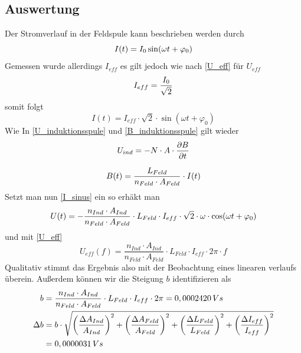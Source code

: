 \documentclass{article}
\begin{document}
\subsection{Auswertung}
Der Stromverlauf in der Feldspule kann beschrieben werden durch
\begin{equation}
I(t) = I_0 \sin(\omega t + \varphi_0)
\notag
\end{equation}
Gemessen wurde allerdings \( I_{eff} \) es gilt jedoch wie nach \eqref{U_eff} für \( U_{eff} \)
\begin{equation}
I_{eff} = \frac{I_0}{\sqrt{2}}
\notag
\end{equation}
somit folgt
\begin{equation}
I(t) = I_{eff} \cdot \sqrt{2} \cdot \sin(\omega t + \varphi_0)
\label{I_sinus}
\end{equation}
Wie In \eqref{U_induktionsspule} und \eqref{B_induktionsspule} gilt wieder
\begin{equation}
U_{ind} = -N \cdot A \cdot \frac{\partial B}{\partial t}
\notag
\end{equation}

\begin{equation}
B(t) = \frac{L_{Feld}}{n_{Feld} \cdot A_{Feld}} \cdot I(t)
\notag
\end{equation}
Setzt man nun \eqref{I_sinus} ein so erhäkt man
\begin{equation}
U(t) = -\frac{n_{Ind} \cdot A_{Ind}}{n_{Feld} \cdot A_{Feld}} \cdot L_{Feld} \cdot I_{eff} \cdot \sqrt{2} \cdot \omega \cdot \cos(\omega t + \varphi_0)
\notag
\end{equation}
und mit \eqref{U_eff}
\begin{equation}
U_{eff}(f) = \frac{n_{Ind} \cdot A_{Ind}}{n_{Feld} \cdot A_{Feld}} \cdot L_{Feld} \cdot I_{eff} \cdot 2\pi \cdot f
\label{U_eff(t)}
\end{equation}
Qualitativ stimmt das Ergebnis also mit der Beobachtung eines linearen verlaufs überein. Außerdem können wir die Steigung \(b\) identifizieren als
\begin{align}
b &= \frac{n_{Ind} \cdot A_{Ind}}{n_{Feld} \cdot A_{Feld}} \cdot L_{Feld} \cdot I_{eff} \cdot 2\pi
= 0,0002420 \,Vs
\notag
\\
\Delta b &= b \cdot \sqrt{
\left( \frac{\Delta A_{Ind}}{A_{Ind}} \right)^2 +
\left( \frac{\Delta A_{Feld}}{A_{Feld}} \right)^2 +
\left( \frac{\Delta L_{Feld}}{L_{Feld}} \right)^2 +
\left( \frac{\Delta I_{eff}}{I_{eff}} \right)^2
}
\notag
\\
&= 0,0000031 \, Vs
\end{align} 
\end{document}
